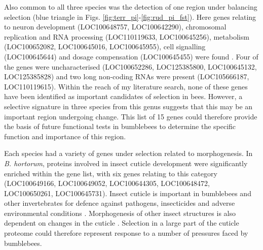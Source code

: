 \documentclass[12pt]{article}
\begin{document}
\begin{linenumbers}
	Also common to all three species was the detection of one region under balancing selection (blue triangle in Figs. \ref{fig:terr_pi}-\ref{fig:rud_pi_fst}). 
	Here genes relating to neuron development (LOC100648757, LOC100642290), chromosomal replication and RNA processing (LOC110119633, \linebreak LOC100645256), metabolism (LOC100652082, LOC100645016, LOC100645955), cell signalling (LOC100645644) and dosage compensation (LOC100645455) were found \citep{manak_mutation_2002, walker_reduced_2006, saint-pol_new_2017, diao_genomic_2018}. Four of the genes were uncharacterised (LOC100652286, LOC125385800, LOC100645132, LOC125385828) and two long non-coding RNAs were present (LOC105666187, LOC110119615). Within the reach of my literature search, none of these genes have been identified as important candidates of selection in bees. However, a selective signature in three species from this genus suggests that this may be an important region undergoing change. This list of 15 genes could therefore provide the basis of future functional tests in bumblebees to determine the specific function and importance of this region.

%


	Each species had a variety of genes under selection related to morphogenesis. In \emph{B. hortorum}, proteins involved in insect cuticle development were significantly enriched within the gene list, with six genes relating to this category (LOC100649166, LOC100649052, LOC100644305, LOC100648472, LOC100650261, LOC100645731). 
    Insect cuticle is important in bumblebees and other invertebrates for defence against pathogens, insecticides and adverse environmental conditions \citep{liao_34-dihydroxyphenylacetaldehyde_2018, jackson_local_2020}. Morphogenesis of other insect structures is also dependent on changes in the cuticle \citep{kucharski_novel_2007, sun_genus-wide_2021}. Selection in a large part of the cuticle proteome could therefore represent response to a number of pressures faced by bumblebees. 
    	

\end{linenumbers}
\end{document}
